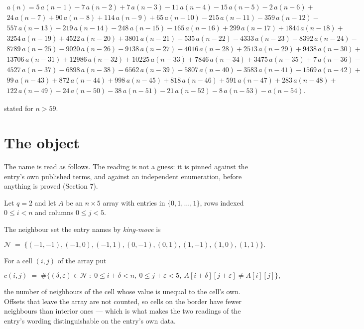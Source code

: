 \documentclass[11pt]{article}
\theoremstyle{definition}
\begin{document}
\begin{multline*} a(n) = 5\,a(n-1) - 7\,a(n-2) + 7\,a(n-3) - 11\,a(n-4) - 15\,a(n-5) - 2\,a(n-6) + \\ 24\,a(n-7) + 90\,a(n-8) + 114\,a(n-9) + 65\,a(n-10) - 215\,a(n-11) - 359\,a(n-12) - \\ 557\,a(n-13) - 219\,a(n-14) - 248\,a(n-15) - 165\,a(n-16) + 299\,a(n-17) + 1844\,a(n-18) + \\ 3254\,a(n-19) + 4522\,a(n-20) + 3801\,a(n-21) - 535\,a(n-22) - 4333\,a(n-23) - 8392\,a(n-24) - \\ 8789\,a(n-25) - 9020\,a(n-26) - 9138\,a(n-27) - 4016\,a(n-28) + 2513\,a(n-29) + 9438\,a(n-30) + \\ 13706\,a(n-31) + 12986\,a(n-32) + 10225\,a(n-33) + 7846\,a(n-34) + 3475\,a(n-35) + 7\,a(n-36) - \\ 4527\,a(n-37) - 6898\,a(n-38) - 6562\,a(n-39) - 5807\,a(n-40) - 3583\,a(n-41) - 1569\,a(n-42) + \\ 99\,a(n-43) + 872\,a(n-44) + 998\,a(n-45) + 818\,a(n-46) + 591\,a(n-47) + 283\,a(n-48) + \\ 122\,a(n-49) - 24\,a(n-50) - 38\,a(n-51) - 21\,a(n-52) - 8\,a(n-53) - a(n-54). \end{multline*}

stated for $n > 59$.

\section{The object}

The name is read as follows. The reading is not a guess: it is pinned against the entry's own published terms, and against an independent enumeration, before anything is proved (Section 7).

Let $q = 2$ and let $A$ be an $n \times 5$ array with entries in $\{0,1,\dots,1\}$, rows indexed $0 \le i < n$ and columns $0 \le j < 5$.

The neighbour set the entry names by {\itshape king-move} is

\[\mathcal{N} \;=\; \{(-1,-1), (-1,0), (-1,1), (0,-1), (0,1), (1,-1), (1,0), (1,1)\}.\]

For a cell $(i,j)$ of the array put

\[c(i,j) \;=\; \#\bigl\{(\delta,\varepsilon)\in\mathcal{N} \;:\; 0\le i+\delta<n,\ 0\le j+\varepsilon<5,\ A[i+\delta][j+\varepsilon] \neq A[i][j]\bigr\},\]

the number of neighbours of the cell whose value is unequal to the cell's own. Offsets that leave the array are not counted, so cells on the border have fewer neighbours than interior ones --- which is what makes the two readings of the entry's wording distinguishable on the entry's own data.
\end{document}
